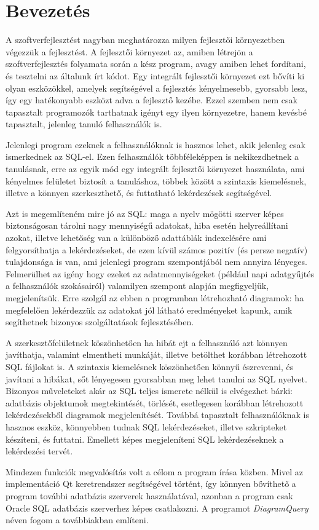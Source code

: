 \chapter{Bevezetés}

A szoftverfejlesztést nagyban meghatározza milyen fejlesztői környezetben végezzük a fejlesztést. A fejlesztői
környezet az, amiben létrejön a szoftverfejlesztés folyamata során a kész program, avagy amiben
lehet fordítani, és tesztelni az általunk írt kódot. Egy integrált fejlesztői környezet ezt bővíti
ki olyan eszközökkel, amelyek segítségével a fejlesztés kényelmesebb, gyorsabb lesz, így egy
hatékonyabb eszközt adva a fejlesztő kezébe. Ezzel szemben nem csak tapasztalt programozók tarthatnak igényt
egy ilyen környezetre, hanem kevésbé tapasztalt, jelenleg tanuló felhasználók is.

Jelenlegi program ezeknek a felhasználóknak is hasznos lehet, akik jelenleg csak ismerkednek az SQL-el. 
Ezen felhasználók többféleképpen is nekikezdhetnek a tanulásnak, erre az
egyik mód egy integrált fejlesztői környezet használata, ami kényelmes
felületet biztosít a tanuláshoz, többek között a szintaxis kiemelésnek,
illetve a könnyen szerkeszthető, és futtatható lekérdezések segítségével.

Azt is megemlíteném mire jó az SQL: maga a nyelv mögötti szerver képes biztonságosan tárolni nagy
mennyiségű adatokat, hiba esetén helyreállítani azokat, illetve lehetőség van a különböző adattáblák indexelésére
ami felgyorsíthatja a lekérdezéseket, de ezen kívül számos pozitív (és persze negatív) tulajdonsága is van,
ami jelenlegi program szempontjából nem annyira lényeges. Felmerülhet az igény hogy ezeket az adatmennyiségeket
(például napi adatgyűjtés a felhasználók szokásairól) valamilyen szempont alapján megfigyeljük, megjelenítsük.
Erre szolgál az ebben a programban létrehozható diagramok: ha megfelelően lekérdezzük az adatokat jól látható
eredményeket kapunk, amik segíthetnek bizonyos szolgáltatások fejlesztésében.

A szerkesztőfelületnek köszönhetően ha hibát ejt a felhasználó azt könnyen
javíthatja, valamint elmentheti munkáját, illetve betölthet korábban létrehozott
SQL fájlokat is. A szintaxis kiemelésnek köszönhetően könnyű észrevenni,
és javítani a hibákat, sőt lényegesen gyorsabban meg lehet tanulni az SQL
nyelvet. Bizonyos műveleteket akár az SQL teljes ismerete nélkül is elvégezhet bárki:
adatbázis objektumok megtekintését, törlését, esetlegesen korábban létrehozott lekérdezésekből
diagramok megjelenítését.
Továbbá tapasztalt felhasználóknak is hasznos eszköz, könnyebben tudnak SQL
lekérdezéseket, illetve szkripteket készíteni, és futtatni. Emellett képes megjeleníteni
SQL lekérdezéseknek a lekérdezési tervét.

Mindezen funkciók megvalósítás volt a célom a program írása közben. Mivel az
implementáció Qt keretrendszer segítségével történt, így könnyen bővíthető a program további adatbázis szerverek
használatával, azonban a program csak Oracle SQL adatbázis szerverhez képes csatlakozni.
A programot \textit{DiagramQuery} néven fogom a továbbiakban említeni.